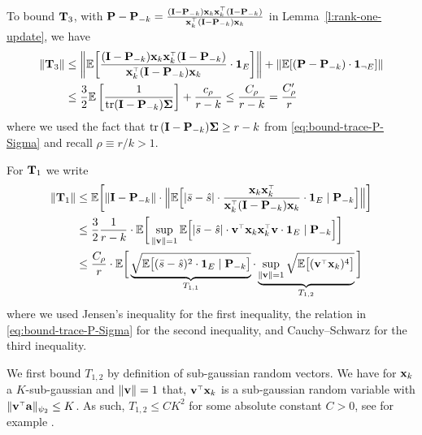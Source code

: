 \documentclass{article}
\begin{document}
To bound $\mathbf{T}_3$, with $\P - \P_{-k} = \frac{(\I - \P_{-k})\x_k\x_k^\top (\I - \P_{-k})}{\x_k^\top (\I - \P_{-k}) \x_k}$ in Lemma~\ref{l:rank-one-update}, we have
\begin{align*}
\|\T_3\| &\leq  \bigg\|
  \E\bigg[\frac{ (\I - \P_{-k}) \x_k\x_k^\top (\I - \P_{-k})}{\x_k^\top (\I - \P_{-k}) \x_k}
  \cdot \one_E \bigg]\bigg\|  + \| \E[ (\P - \P_{-k}) \cdot \one_{\neg E} ] \| \\ 
  &\le \frac32 \E \left[ \frac1{ \tr (\I - \P_{-k} ) \Sigmab } \right] + \frac{c_\rho}{r - k} \leq \frac{C_\rho}{r-k} = \frac{C'_\rho}{r}
\end{align*}
where we used the fact that $\mathrm{tr}\,(\mathbf I - \mathbf P_{-k}) \mathbf{\Sigma} \ge r -k $ from \eqref{eq:bound-trace-P-Sigma} and recall $\rho \equiv r/k > 1$.


For $\mathbf{T}_1$ we write
\begin{align*}
  \|\T_1\|    &\leq\E\bigg[\|\I - \P_{-k}\|\cdot \Big\|\E\Big[|\bar s-\hat s|\cdot
    \frac{\x_k\x_k^\top}{\x_k^\top( \I - \P_{-k}) \x_k} \cdot \one_E\mid\P_{-k}\Big]
    \Big\|\bigg]
  \\
          &\leq \frac32 \frac1{r-k} \cdot \E\bigg[\sup_{\| \v \| = 1}\E\Big[
            |\bar s-\hat s|\cdot \v^\top\x_k\x_k^\top\v\cdot\one_E\mid
            \P_{-k}\Big]\bigg]
  \\
  &\leq \frac{C_\rho}{r}\cdot \E\bigg[\underbrace{\sqrt{\E\big[(\bar s-\hat
    s)^2\cdot \one_E \mid\P_{-k}\big]}}_{ T_{1,1} }\cdot
    \underbrace{\sup_{ \| \v \| = 1 }\sqrt{\E\big[(\v^\top\x_k)^4\big]}}_{ T_{1,2} }\bigg]
\end{align*}
where we used Jensen's inequality for the first inequality, the relation in \eqref{eq:bound-trace-P-Sigma} for the second inequality, and Cauchy–Schwarz for the third inequality.

We first bound $T_{1,2}$ by definition of sub-gaussian random
vectors. We have for $\mathbf x_k$ a $K$-sub-gaussian and $\| \mathbf v \| = 1$
that, $\v^\top \x_k$ is a sub-gaussian random variable with $\|\v^\top
\a \|_{\psi_2} \leq K$. As such, $T_{1,2} \le C K^2$ for some absolute
constant $C > 0$, see for example
\cite[Section~2.5.2]{vershynin2018high}. 
\end{document}
